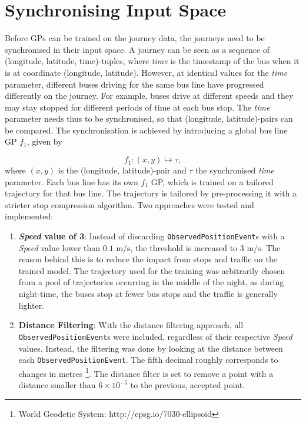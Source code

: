 \section{Synchronising Input Space} \label{sec:synchronisation}
Before GPs can be trained on the journey data, the journeys need to be synchronised in their input space.
A journey can be seen as a sequence of (longitude, latitude, time)-tuples, where \textit{time} is the timestamp of the bus when it is at coordinate (longitude, latitude).
However, at identical values for the \textit{time} parameter, different buses driving for the same bus line have progressed differently on the journey.
For example, buses drive at different speeds and they may stay stopped for different periods of time at each bus stop.
The \textit{time} parameter needs thus to be synchronised, so that (longitude, latitude)-pairs can be compared.
The synchronisation is achieved by introducing a global bus line GP $f_1$, given by

\begin{equation} \label{eq:gps-var-f1}
    f_1: (x, y) \longmapsto \tau,
 \end{equation}
where $(x, y)$ is the (longitude, latitude)-pair and $\tau$ the synchronised \textit{time} parameter.
Each bus line has its own $f_1$ GP, which is trained on a tailored trajectory for that bus line.
The trajectory is tailored by pre-processing it with a stricter stop compression algorithm.
Two approaches were tested and implemented:
\begin{enumerate}
    \item \textbf{\textit{Speed} value of 3}:
    Instead of discarding \texttt{ObservedPositionEvent}s with a \textit{Speed} value lower than $0.1$ m/s, the threshold is increased to $3$ m/s.
    The reason behind this is to reduce the impact from stops and traffic on the trained model.
    The trajectory used for the training was arbitrarily chosen from a pool of trajectories occurring in the middle of the night, as during night-time, the buses stop at fewer bus stops and the traffic is generally lighter.
    \item \textbf{Distance Filtering}:
    With the distance filtering approach, all \texttt{ObservedPositionEvent}s were included, regardless of their respective \textit{Speed} values.
    Instead, the filtering was done by looking at the distance between each \texttt{ObservedPositionEvent}.
    The fifth decimal roughly corresponds to changes in metres \footnote{World Geodetic System: http://epsg.io/7030-ellipsoid}.
    The distance filter is set to remove a point with a distance smaller than $6\times10^{-5}$ to the previous, accepted point.
\end{enumerate}

